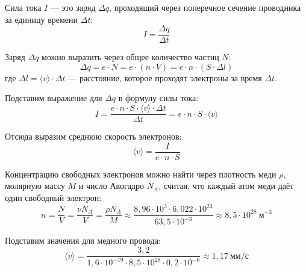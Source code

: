 Сила тока $I$ — это заряд $\Delta q$, проходящий через поперечное сечение проводника за единицу времени $\Delta t$:
\[ I = \frac{\Delta q}{\Delta t} \]

Заряд $\Delta q$ можно выразить через общее количество частиц $N$:
\[ \Delta q = e \cdot N = e \cdot (n \cdot V) = e \cdot n \cdot (S \cdot \Delta l) \]
где $\Delta l = \langle v \rangle \cdot \Delta t$ — расстояние, которое проходят электроны за время $\Delta t$.

Подставим выражение для $\Delta q$ в формулу силы тока:
\[ I = \frac{e \cdot n \cdot S \cdot \langle v \rangle \cdot \Delta t}{\Delta t} = e \cdot n \cdot S \cdot \langle v \rangle \]

Отсюда выразим среднюю скорость электронов:
\[ \boxed{\langle v \rangle = \frac{I}{e \cdot n \cdot S}} \]

Концентрацию свободных электронов можно найти через плотность меди $\rho$, молярную массу $M$ и число Авогадро $N_A$, считая, что каждый атом меди даёт один свободный электрон:
\[ 
n = \frac{N}{V} = \frac{\nu N_A}{V} = \frac{\rho N_A}{M}\approx \frac{8{,}96\cdot10^3 \cdot 6{,}022\cdot10^{23}}{63{,}5\cdot10^{-3}} \approx 8{,}5\cdot10^{28}\ \text{м}^{-3}
\]

Подставим значения для медного провода:
\[ 
\langle v \rangle = \frac{3{,}2}{1{,}6 \cdot 10^{-19} \cdot 8{,}5 \cdot 10^{28} \cdot 0{,}2 \cdot 10^{-6}}\approx 1{,}17\ \text{мм/с} 
\]